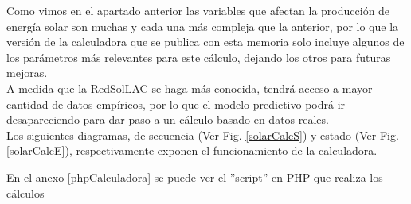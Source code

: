 Como vimos en el apartado anterior las variables que afectan la producción de energía solar son muchas y cada una más compleja que la anterior, por lo que la versión de la calculadora que se publica con esta memoria solo incluye algunos de los parámetros más relevantes para este cálculo, dejando los otros para futuras mejoras.\\

A medida que la RedSolLAC se haga más conocida, tendrá acceso a mayor cantidad de datos empíricos, por lo que el modelo predictivo podrá ir desapareciendo para dar paso a un cálculo basado en datos reales.\\

Los siguientes diagramas, de secuencia (Ver Fig. \ref{solarCalcS}) y estado (Ver Fig. \ref{solarCalcE}), respectivamente exponen el funcionamiento de la calculadora.

En el anexo \ref{phpCalculadora} se puede ver el ''script'' en PHP que realiza los cálculos\\

